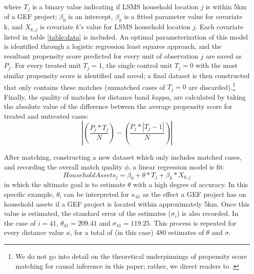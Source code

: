 \documentclass[sustainability,article,submit,moreauthors,pdftex]{Definitions/mdpi}
\begin{document}
where $T_{j}$ is a binary value indicating if LSMS household location $j$ is within 5km of a GEF project; $\beta_0$ is an intercept, $\beta_{k}$ is a fitted parameter value for covariate k, and $X_{k,j}$ is covariate $k$'s value for LSMS household location $j$.  Each covariate listed in table \ref{table:data} is included.  An optimal parameterization of this model is identified through a logistic regression least squares approach, and the resultant propensity score predicted for every unit of observation $j$ are saved as $P_{j}$.  For every treated unit $T_{j} = 1$, the single control unit $T_{j} = 0$ with the most similar propensity score is identified and saved; a final dataset is then constructed that only contains these matches (unmatched cases of $T_{j} = 0$ are discarded).\footnote{We do not go into detail on the theoretical underpinnings of propensity score matching for causal inference in this paper; rather, we direct readers to \cite{ZhaoQuantifyingProjects}.}  Finally, the quality of matches for distance band $kappa_{i}$ are calculated by taking the absolute value of the difference between the average propensity score for treated and untreated cases:
\begin{equation}
    \left | \left (  \frac{P_{j}* T_{j}}{N} \right ) - \left (  \frac{P_{j}* \left|T_{j}-1\right |}{N} \right )  \right |
\end{equation}
\par
After matching, constructing a new dataset which only includes matched cases, and recording the overall match quality $\phi$, a linear regression model is fit:
\begin{equation}
    Household Assets_{j} = \beta_{0} + \theta * T_{j} + \beta_{k} * X_{k,j}
\end{equation}
in which the ultimate goal is to estimate $\theta$ with a high degree of accuracy. In this specific example, $\theta_{i}$ can be interpreted for $\kappa_{41}$ as the effect a GEF project has on household assets if a GEF project is located within approximately 5km.  Once this value is estimated, the standard error of the estimates ($\sigma_{i}$) is also recorded.  In the case of $i = 41$, $\theta_{41} = 209.41$ and $\sigma_{41} = 119.25$.  This process is repeated for every distance value $\kappa$, for a total of (in this case) 480 estimates of $\theta$ and $\sigma$.


 
\end{document}
